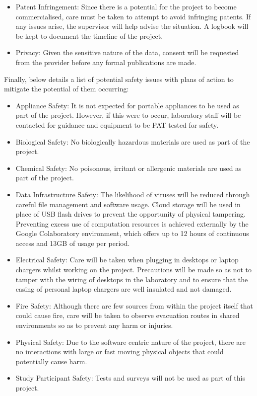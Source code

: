 \documentclass[10pt,onecolumn,letterpaper]{article}
\begin{document}
\begin{itemize}
	\item Patent Infringement: Since there is a potential for the project to become commercialised, care must be taken to attempt to avoid infringing patents. If any issues arise, the supervisor will help advise the situation. A logbook will be kept to document the timeline of the project. 
	\item Privacy: Given the sensitive nature of the data, consent will be requested from the provider before any formal publications are made. 
\end{itemize}

Finally, below details a list of potential safety issues with plans of action to mitigate the potential of them occurring: 

\begin{itemize}
	\item Appliance Safety: It is not expected for portable appliances to be used as part of the project. However, if this were to occur, laboratory staff will be contacted for guidance and equipment to be PAT tested for safety. 
	\item Biological Safety: No biologically hazardous materials are used as part of the project. 
	\item Chemical Safety: No poisonous, irritant or allergenic materials are used as part of the project. 
	\item Data Infrastructure Safety: The likelihood of viruses will be reduced through careful file management and software usage. Cloud storage will be used in place of USB flash drives to prevent the opportunity of physical tampering. Preventing excess use of computation resources is achieved externally by the Google Colaboratory environment, which offers up to 12 hours of continuous access and 13GB of usage per period. 
	\item Electrical Safety: Care will be taken when plugging in desktops or laptop chargers whilst working on the project. Precautions will be made so as not to tamper with the wiring of desktops in the laboratory and to ensure that the casing of personal laptop chargers are well insulated and not damaged. 
	\item Fire Safety: Although there are few sources from within the project itself that could cause fire, care will be taken to observe evacuation routes in shared environments so as to prevent any harm or injuries. 
	\item Physical Safety: Due to the software centric nature of the project, there are no interactions with large or fast moving physical objects that could potentially cause harm. 
	\item Study Participant Safety: Tests and surveys will not be used as part of this project. 
\end{itemize}
\end{document}
